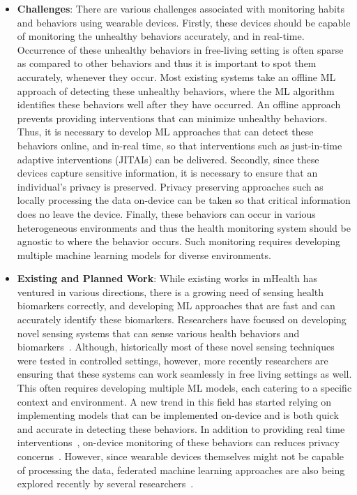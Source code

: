 \begin{itemize}
        \item \textbf{Challenges}: There are various challenges associated with monitoring habits and behaviors using wearable devices. Firstly, these devices should be capable of monitoring the unhealthy behaviors accurately, and in real-time. Occurrence of these unhealthy behaviors in free-living setting is often sparse as compared to other behaviors and thus it is important to spot them accurately, whenever they occur. Most existing systems take an offline ML approach of detecting these unhealthy behaviors, where the ML algorithm identifies these behaviors  well after they have occurred. An offline approach prevents providing interventions that can minimize unhealthy behaviors. Thus, it is necessary to develop ML approaches that can detect these behaviors online, and in-real time, so that interventions such as just-in-time adaptive interventions (JITAIs) can be delivered. Secondly, since these devices capture sensitive information, it is necessary to ensure that an individual's privacy is preserved. Privacy preserving approaches such as locally processing the data on-device can be taken so that critical information does no leave the device. 
        Finally, these behaviors can occur in various heterogeneous environments and thus the health monitoring system should be agnostic to where the behavior occurs. Such monitoring requires developing multiple machine learning models for diverse environments.  
        \item \textbf{Existing and Planned Work}: While existing works in mHealth has ventured in various directions, there is a growing need of sensing health biomarkers correctly, and developing ML approaches that are fast and can accurately identify these biomarkers. Researchers have focused on developing novel sensing systems that can sense various  health behaviors and biomarkers~\cite{holz2017glabella,pham2020wake,chun2020intraoral,bui2019ebp,li2020noninvasive,echterhoff2020personal,bedri2020fitbyte}. Although, historically most of these novel sensing techniques were tested in controlled settings, however, more recently researchers are ensuring that these systems can work seamlessly in free living settings as well. This often requires developing multiple ML models, each catering to a specific context and environment. A new trend in this field has started relying on implementing models that can be implemented on-device and is both quick and accurate in detecting these behaviors. In addition to providing real time interventions~\cite{nahum2018just,thomas2015behavioral}, on-device monitoring of these behaviors can reduces privacy concerns~\cite{sadek2019privacy}. However, since wearable devices themselves might not be capable of processing the data, federated machine learning approaches are also being explored recently by several researchers~\cite{rieke2020future}.  
    \end{itemize}

